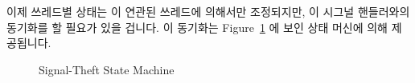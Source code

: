 이제 쓰레드별 상태는 이 연관된 쓰레드에 의해서만 조정되지만, 이 시그널
핸들러와의 동기화를 할 필요가 있을 겁니다.
이 동기화는
Figure~\ref{fig:count:Signal-Theft State Machine} 에 보인 상태 머신에 의해
제공됩니다.

\begin{figure}[tb]
\centering
{}
\caption{Signal-Theft State Machine}
\label{fig:count:Signal-Theft State Machine}
\end{figure}

